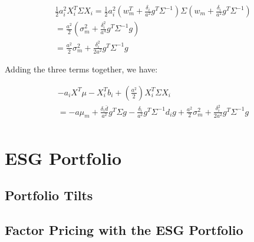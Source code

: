\begin{equation}
    \begin{aligned}
    \frac{1}{2}a_i^2 X_i^T \Sigma X_i = \frac{1}{2}a_i^2 (w_m^T + \frac{\delta_i}{a^2} g^T \Sigma^{-1}) \Sigma (w_m + \frac{\delta_i}{a^2} g^T \Sigma^{-1}) \\
        = \frac{a^2}{2}(\sigma^2_m + \frac{\delta_i^2}{a^4} g^T \Sigma^{-1} g) \\
        = \frac{a^2}{2} \sigma^2_m + \frac{\delta_i^2}{2a^2} g^T \Sigma^{-1} g
    \end{aligned}
\end{equation}

Adding the three terms together, we have:

\begin{equation}
    \begin{aligned}
        -a_i X^T \mu - X_i^T b_i + (\frac{a^2}{2})X_i^T \Sigma X_i \\
        = -a \mu_m + \frac{\delta_i \bar{d}}{a^2} g^T \Sigma g -  \frac{\delta_i}{a^2} g^T \Sigma^{-1} d_i g + \frac{a^2}{2} \sigma^2_m + \frac{\delta_i^2}{2a^2} g^T \Sigma^{-1} g \\
    \end{aligned}
\end{equation}

\section{ESG Portfolio}

\subsection{Portfolio Tilts}


\subsection{Factor Pricing with the ESG Portfolio}
